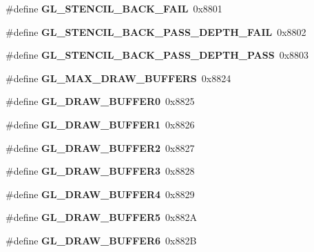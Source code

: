 \begin{DoxyCompactItemize}
\item 
\#define {\bfseries G\+L\+\_\+\+S\+T\+E\+N\+C\+I\+L\+\_\+\+B\+A\+C\+K\+\_\+\+F\+A\+I\+L}~0x8801\label{_s_d_l__opengl_8h_a1ffa1e7b112d976c2487858b0d612e5e}

\item 
\#define {\bfseries G\+L\+\_\+\+S\+T\+E\+N\+C\+I\+L\+\_\+\+B\+A\+C\+K\+\_\+\+P\+A\+S\+S\+\_\+\+D\+E\+P\+T\+H\+\_\+\+F\+A\+I\+L}~0x8802\label{_s_d_l__opengl_8h_a3b8bdd9068dbed55386fcf4742149ca3}

\item 
\#define {\bfseries G\+L\+\_\+\+S\+T\+E\+N\+C\+I\+L\+\_\+\+B\+A\+C\+K\+\_\+\+P\+A\+S\+S\+\_\+\+D\+E\+P\+T\+H\+\_\+\+P\+A\+S\+S}~0x8803\label{_s_d_l__opengl_8h_ad9262afb6e71de6b55716ea503b5608c}

\item 
\#define {\bfseries G\+L\+\_\+\+M\+A\+X\+\_\+\+D\+R\+A\+W\+\_\+\+B\+U\+F\+F\+E\+R\+S}~0x8824\label{_s_d_l__opengl_8h_a91ba8bd0010298f5ccacbf675b968040}

\item 
\#define {\bfseries G\+L\+\_\+\+D\+R\+A\+W\+\_\+\+B\+U\+F\+F\+E\+R0}~0x8825\label{_s_d_l__opengl_8h_aa2469283a1f0e9ac2e284fda0986904b}

\item 
\#define {\bfseries G\+L\+\_\+\+D\+R\+A\+W\+\_\+\+B\+U\+F\+F\+E\+R1}~0x8826\label{_s_d_l__opengl_8h_a2d6bd6c745a1de4d1465f593fb9c6490}

\item 
\#define {\bfseries G\+L\+\_\+\+D\+R\+A\+W\+\_\+\+B\+U\+F\+F\+E\+R2}~0x8827\label{_s_d_l__opengl_8h_ab3e702cb6674aec6967dd262580942cb}

\item 
\#define {\bfseries G\+L\+\_\+\+D\+R\+A\+W\+\_\+\+B\+U\+F\+F\+E\+R3}~0x8828\label{_s_d_l__opengl_8h_a72edb5a40dd8de4cedc6bdc8d03f5158}

\item 
\#define {\bfseries G\+L\+\_\+\+D\+R\+A\+W\+\_\+\+B\+U\+F\+F\+E\+R4}~0x8829\label{_s_d_l__opengl_8h_a6dc6a00d55ace50abd475919abe731b0}

\item 
\#define {\bfseries G\+L\+\_\+\+D\+R\+A\+W\+\_\+\+B\+U\+F\+F\+E\+R5}~0x882\+A\label{_s_d_l__opengl_8h_a42b24eef0f5ea7e18cff8280b99fc75a}

\item 
\#define {\bfseries G\+L\+\_\+\+D\+R\+A\+W\+\_\+\+B\+U\+F\+F\+E\+R6}~0x882\+B\label{_s_d_l__opengl_8h_a3ddf0efa0deb687be24a1320b18a951b}


\end{DoxyCompactItemize}

